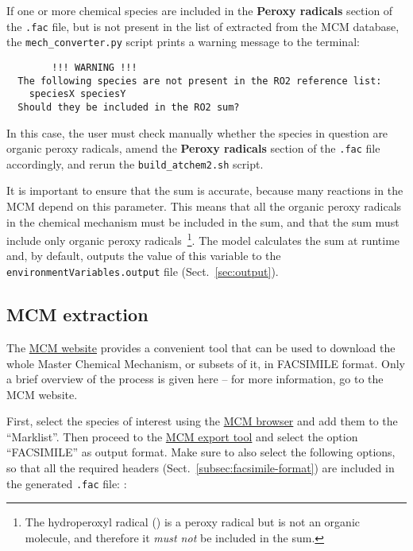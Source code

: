 If one or more chemical species are included in the \textbf{Peroxy radicals}
section of the \texttt{.fac} file, but is not present in the
list of  extracted from the MCM database, the
\texttt{mech\_converter.py} script prints a warning message to the
terminal:

\begin{verbatim}
        !!! WARNING !!!
  The following species are not present in the RO2 reference list:
    speciesX speciesY
  Should they be included in the RO2 sum?
\end{verbatim}

In this case, the user must check manually whether the species in
question are organic peroxy radicals, amend the \textbf{Peroxy radicals}
section of the \texttt{.fac} file accordingly, and rerun the
\texttt{build\_atchem2.sh} script.

It is important to ensure that the  sum is accurate, because
many reactions in the MCM depend on this parameter. This means that
all the organic peroxy radicals in the chemical mechanism must be
included in the  sum, and that the  sum must include
only organic peroxy radicals~\footnote{The hydroperoxyl radical
  () is a peroxy radical but is not an organic molecule, and
  therefore it \emph{must not} be included in the  sum.}. The
model calculates the  sum at runtime and, by default, outputs
the value of this variable to the \texttt{environmentVariables.output}
file (Sect.~\ref{sec:output}).

\subsection{MCM extraction} \label{subsec:mcm-extraction}

The \href{https://mcm.york.ac.uk/MCM/}{MCM website} provides a
convenient tool that can be used to download the whole Master Chemical
Mechanism, or subsets of it, in FACSIMILE format. Only a brief
overview of the process is given here -- for more information, go to
the MCM website.

First, select the species of interest using the
\href{https://mcm.york.ac.uk/MCM/browse}{MCM browser} and add them to
the ``Marklist''. Then proceed to the
\href{https://mcm.york.ac.uk/MCM/export}{MCM export tool} and select
the option ``FACSIMILE'' as output format. Make sure to also select
the following options, so that all the required headers
(Sect.~\ref{subsec:facsimile-format}) are included in the generated
\texttt{.fac} file: :


